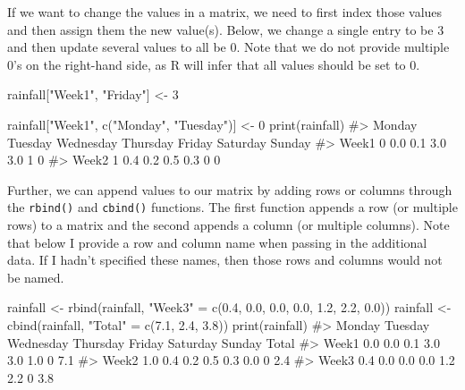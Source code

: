\documentclass[
  letterpaper,
]{krantz}
\makeatletter
\newenvironment{Shaded}{\begin{snugshade}}{\end{snugshade}}
\newcommand{\CommentTok}[1]{\textcolor[rgb]{0.37,0.37,0.37}{#1}}
\newcommand{\DecValTok}[1]{\textcolor[rgb]{0.68,0.00,0.00}{#1}}
\newcommand{\FloatTok}[1]{\textcolor[rgb]{0.68,0.00,0.00}{#1}}
\newcommand{\FunctionTok}[1]{\textcolor[rgb]{0.28,0.35,0.67}{#1}}
\newcommand{\NormalTok}[1]{\textcolor[rgb]{0.00,0.23,0.31}{#1}}
\newcommand{\OtherTok}[1]{\textcolor[rgb]{0.00,0.23,0.31}{#1}}
\newcommand{\StringTok}[1]{\textcolor[rgb]{0.13,0.47,0.30}{#1}}
\newenvironment{kframe}{%
\medskip{}
\setlength{\fboxsep}{.8em}
 \def\at@end@of@kframe{}%
 \ifinner\ifhmode%
  \def\at@end@of@kframe{\end{minipage}}%
  \begin{minipage}{\columnwidth}%
 \fi\fi%
 \def\FrameCommand##1{\hskip\@totalleftmargin \hskip-\fboxsep
 \colorbox{shadecolor}{##1}\hskip-\fboxsep
     \hskip-\linewidth \hskip-\@totalleftmargin \hskip\columnwidth}%
 \MakeFramed {\advance\hsize-\width
   \@totalleftmargin\z@ \linewidth\hsize
   \@setminipage}}%
 {\par\unskip\endMakeFramed%
 \at@end@of@kframe}
\renewenvironment{Shaded}{\begin{kframe}}{\end{kframe}}
\makeatother
\begin{document}
If we want to change the values in a matrix, we need to first index
those values and then assign them the new value(s). Below, we change a
single entry to be 3 and then update several values to all be 0. Note
that we do not provide multiple 0's on the right-hand side, as R will
infer that all values should be set to 0.

\begin{Shaded}
\begin{Highlighting}[]
\NormalTok{rainfall[}\StringTok{"Week1"}\NormalTok{, }\StringTok{"Friday"}\NormalTok{] }\OtherTok{\textless{}{-}} \DecValTok{3}
\end{Highlighting}
\end{Shaded}

\begin{Shaded}
\begin{Highlighting}[]
\NormalTok{rainfall[}\StringTok{"Week1"}\NormalTok{, }\FunctionTok{c}\NormalTok{(}\StringTok{"Monday"}\NormalTok{, }\StringTok{"Tuesday"}\NormalTok{)] }\OtherTok{\textless{}{-}} \DecValTok{0}
\FunctionTok{print}\NormalTok{(rainfall)}
\CommentTok{\#\textgreater{}       Monday Tuesday Wednesday Thursday Friday Saturday Sunday}
\CommentTok{\#\textgreater{} Week1      0     0.0       0.1      3.0    3.0        1      0}
\CommentTok{\#\textgreater{} Week2      1     0.4       0.2      0.5    0.3        0      0}
\end{Highlighting}
\end{Shaded}

Further, we can append values to our matrix by adding rows or columns
through the \texttt{rbind()} and \texttt{cbind()} functions. The first
function appends a row (or multiple rows) to a matrix and the second
appends a column (or multiple columns). Note that below I provide a row
and column name when passing in the additional data. If I hadn't
specified these names, then those rows and columns would not be named.

\begin{Shaded}
\begin{Highlighting}[]
\NormalTok{rainfall }\OtherTok{\textless{}{-}} \FunctionTok{rbind}\NormalTok{(rainfall, }\StringTok{"Week3"} \OtherTok{=} \FunctionTok{c}\NormalTok{(}\FloatTok{0.4}\NormalTok{, }\FloatTok{0.0}\NormalTok{, }\FloatTok{0.0}\NormalTok{, }\FloatTok{0.0}\NormalTok{, }\FloatTok{1.2}\NormalTok{, }\FloatTok{2.2}\NormalTok{, }\FloatTok{0.0}\NormalTok{))}
\NormalTok{rainfall }\OtherTok{\textless{}{-}} \FunctionTok{cbind}\NormalTok{(rainfall, }\StringTok{"Total"} \OtherTok{=} \FunctionTok{c}\NormalTok{(}\FloatTok{7.1}\NormalTok{, }\FloatTok{2.4}\NormalTok{, }\FloatTok{3.8}\NormalTok{))}
\FunctionTok{print}\NormalTok{(rainfall)}
\CommentTok{\#\textgreater{}       Monday Tuesday Wednesday Thursday Friday Saturday Sunday Total}
\CommentTok{\#\textgreater{} Week1    0.0     0.0       0.1      3.0    3.0      1.0      0   7.1}
\CommentTok{\#\textgreater{} Week2    1.0     0.4       0.2      0.5    0.3      0.0      0   2.4}
\CommentTok{\#\textgreater{} Week3    0.4     0.0       0.0      0.0    1.2      2.2      0   3.8}
\end{Highlighting}
\end{Shaded}
\end{document}
